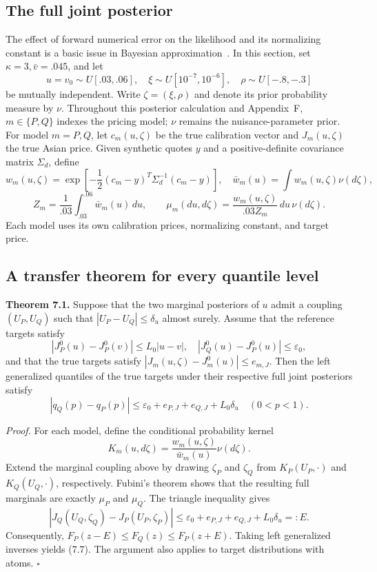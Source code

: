 \subsection{The full joint posterior}

The effect of forward numerical error on the likelihood and its normalizing constant
is a basic issue in Bayesian approximation~\cite{CotterDashtiStuart2010}.
In this section, set \(\kappa=3,\bar v=.045\), and let
\[
u=v_0\sim U[.03,.06],\quad
\xi\sim U[10^{-7},10^{-6}],\quad
\rho\sim U[-.8,-.3]
\tag{7.5}
\]
be mutually independent.
Write \(\zeta=(\xi,\rho)\) and denote its prior probability measure by \(\nu\). Throughout this posterior calculation and Appendix~F, \(m\in\{P,Q\}\) indexes the pricing model; \(\nu\) remains the nuisance-parameter prior.
For model \(m=P,Q\), let \(c_m(u,\zeta)\) be the true calibration vector and
\(J_m(u,\zeta)\) the true Asian price.
Given synthetic quotes \(y\) and a positive-definite covariance matrix \(\Sigma_d\), define
\[
w_m(u,\zeta)=
\exp\!\left[-\frac12(c_m-y)^T\Sigma_d^{-1}(c_m-y)\right],
\quad \bar w_m(u)=\int w_m(u,\zeta)\nu(d\zeta),
\]
\[
Z_m=\frac1{.03}\int_{.03}^{.06}\bar w_m(u)\,du,\qquad
\mu_m(du,d\zeta)=\frac{w_m(u,\zeta)}{.03Z_m}\,du\,\nu(d\zeta).
\tag{7.6}
\]
Each model uses its own calibration prices, normalizing constant, and target price.

\subsection{A transfer theorem for every quantile level}

\textbf{Theorem 7.1.}
Suppose that the two marginal posteriors of \(u\) admit a coupling \((U_P,U_Q)\)
such that \(|U_P-U_Q|\le\delta_u\) almost surely.
Assume that the reference targets satisfy
\[
|J_P^0(u)-J_P^0(v)|\le L_0|u-v|,
\quad
|J_Q^0(u)-J_P^0(u)|\le\varepsilon_0,
\]
and that the true targets satisfy
\(|J_m(u,\zeta)-J_m^0(u)|\le e_{m,J}\).
Then the left generalized quantiles of the true targets under their respective full joint
posteriors satisfy
\[
\boxed{\quad
|q_Q(p)-q_P(p)|
\le \varepsilon_0+e_{P,J}+e_{Q,J}+L_0\delta_u
\quad(0<p<1).\quad}
\tag{7.7}
\]

\textit{Proof.}
For each model, define the conditional probability kernel
\[
K_m(u,d\zeta)=\frac{w_m(u,\zeta)}{\bar w_m(u)}\nu(d\zeta).
\]
Extend the marginal coupling above by drawing \(\zeta_P\) and \(\zeta_Q\) from
\(K_P(U_P,\cdot)\) and \(K_Q(U_Q,\cdot)\), respectively.
Fubini's theorem shows that the resulting full marginals are exactly \(\mu_P\) and \(\mu_Q\).
The triangle inequality gives
\[
|J_Q(U_Q,\zeta_Q)-J_P(U_P,\zeta_P)|
\le\varepsilon_0+e_{P,J}+e_{Q,J}+L_0\delta_u=:E.
\]
Consequently, \(F_P(z-E)\le F_Q(z)\le F_P(z+E)\).
Taking left generalized inverses yields (7.7).
The argument also applies to target distributions with atoms.
\hfill\(\square\)

